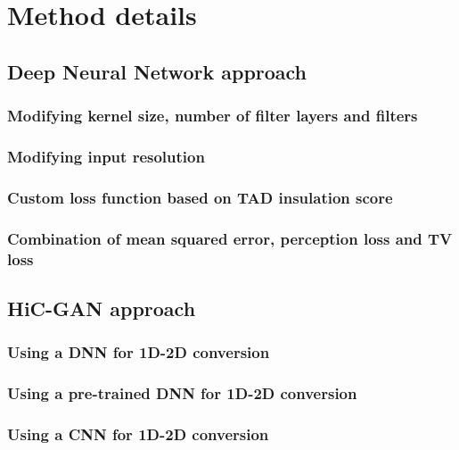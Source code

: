 \section{Method details}
\subsection{Deep Neural Network approach}
\subsubsection{Modifying kernel size, number of filter layers and filters}
\subsubsection{Modifying input resolution}
\subsubsection{Custom loss function based on TAD insulation score}
\subsubsection{Combination of mean squared error, perception loss and TV loss}
\subsection{HiC-GAN approach}
\subsubsection{Using a DNN for 1D-2D conversion}
\subsubsection{Using a pre-trained DNN for 1D-2D conversion}
\subsubsection{Using a CNN for 1D-2D conversion}
